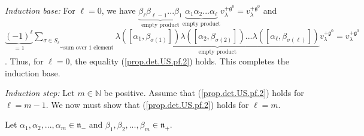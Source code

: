 \documentclass[etingof-lie.tex]{subfiles}
\begin{document}
\textit{Induction base:} For $\ell=0$, we have $\underbrace{\beta_{\ell}%
\beta_{\ell-1}...\beta_{1}}_{\text{empty product}}\underbrace{\alpha_{1}%
\alpha_{2}...\alpha_{\ell}}_{\text{empty product}}v_{\lambda}^{+\mathfrak{g}%
^{0}}=v_{\lambda}^{+\mathfrak{g}^{0}}$ and \newline$\underbrace{\left(
-1\right)  ^{\ell}}_{=1}\underbrace{\sum\limits_{\sigma\in S_{\ell}}%
}_{\text{sum over }1\text{ element}}\underbrace{\lambda\left(  \left[
\alpha_{1},\beta_{\sigma\left(  1\right)  }\right]  \right)  \lambda\left(
\left[  \alpha_{2},\beta_{\sigma\left(  2\right)  }\right]  \right)
...\lambda\left(  \left[  \alpha_{\ell},\beta_{\sigma\left(  \ell\right)
}\right]  \right)  }_{\text{empty product}}v_{\lambda}^{+\mathfrak{g}^{0}%
}=v_{\lambda}^{+\mathfrak{g}^{0}}$. Thus, for $\ell=0$, the equality
(\ref{prop.det.US.pf.2}) holds. This completes the induction base.

\textit{Induction step:} Let $m\in\mathbb{N}$ be positive. Assume that
(\ref{prop.det.US.pf.2}) holds for $\ell=m-1$. We now must show that
(\ref{prop.det.US.pf.2}) holds for $\ell=m$.

Let $\alpha_{1},\alpha_{2},...,\alpha_{m}\in\mathfrak{n}_{-}$ and $\beta
_{1},\beta_{2},...,\beta_{m}\in\mathfrak{n}_{+}$.
\end{document}
